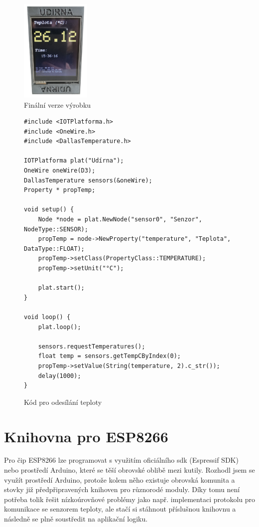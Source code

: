\begin{figure}[htbp]
    \centering
    \includegraphics[width=0.3\textwidth]{img/smokehouse.png}
    \caption{\label{smokehouse}Finální verze výrobku}
\end{figure}

\begin{figure}[h!tb]
    \begin{verbatim}
#include <IOTPlatforma.h>
#include <OneWire.h>
#include <DallasTemperature.h>

IOTPlatforma plat("Udírna");
OneWire oneWire(D3);
DallasTemperature sensors(&oneWire);
Property * propTemp;

void setup() {
    Node *node = plat.NewNode("sensor0", "Senzor", NodeType::SENSOR);
    propTemp = node->NewProperty("temperature", "Teplota", DataType::FLOAT);
    propTemp->setClass(PropertyClass::TEMPERATURE);
    propTemp->setUnit("°C");

    plat.start();
}

void loop() {
    plat.loop();

    sensors.requestTemperatures();
    float temp = sensors.getTempCByIndex(0);
    propTemp->setValue(String(temperature, 2).c_str());
    delay(1000);
}
\end{verbatim}
    \caption{\label{code}Kód pro odesílání teploty}
\end{figure}


\section{Knihovna pro ESP8266}
\label{library}
Pro čip ESP8266 lze programovat s využitím oficiálního sdk (Espressif SDK) nebo prostředí Arduino, které se těší obrovské oblibě mezi kutily. Rozhodl jsem se využít prostředí Arduino, protože kolem něho existuje obrovská komunita a stovky již předpřipravených knihoven pro různorodé moduly. Díky tomu není potřeba tolik řešit nízkoúrovňové problémy jako např. implementaci protokolu pro komunikace se senzorem teploty, ale stačí si stáhnout příslušnou knihovnu a následně se plně soustředit na aplikační logiku.

